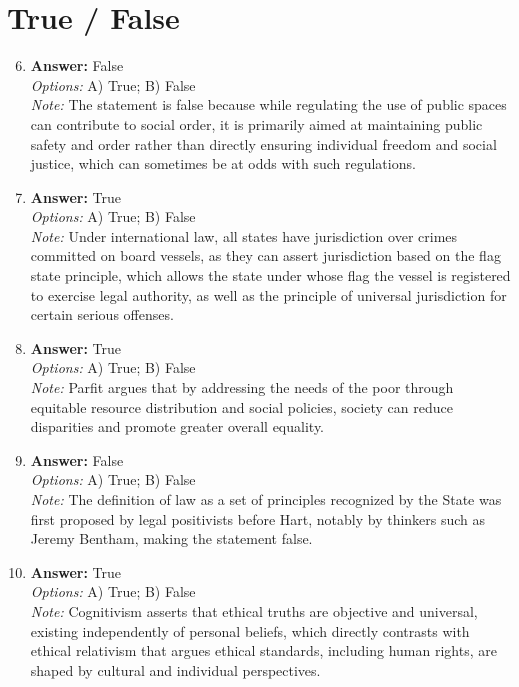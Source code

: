 \documentclass[12pt]{article}
\begin{document}
\section*{True / False}
\begin{enumerate}[label=\arabic*.]
\setcounter{enumi}{5}
\item \textbf{Answer:} False
\\ \textit{Options:} A) True; B) False
\\ \textit{Note:} The statement is false because while regulating the use of public spaces can contribute to social order, it is primarily aimed at maintaining public safety and order rather than directly ensuring individual freedom and social justice, which can sometimes be at odds with such regulations.
\item \textbf{Answer:} True
\\ \textit{Options:} A) True; B) False
\\ \textit{Note:} Under international law, all states have jurisdiction over crimes committed on board vessels, as they can assert jurisdiction based on the flag state principle, which allows the state under whose flag the vessel is registered to exercise legal authority, as well as the principle of universal jurisdiction for certain serious offenses.
\item \textbf{Answer:} True
\\ \textit{Options:} A) True; B) False
\\ \textit{Note:} Parfit argues that by addressing the needs of the poor through equitable resource distribution and social policies, society can reduce disparities and promote greater overall equality.
\item \textbf{Answer:} False
\\ \textit{Options:} A) True; B) False
\\ \textit{Note:} The definition of law as a set of principles recognized by the State was first proposed by legal positivists before Hart, notably by thinkers such as Jeremy Bentham, making the statement false.
\item \textbf{Answer:} True
\\ \textit{Options:} A) True; B) False
\\ \textit{Note:} Cognitivism asserts that ethical truths are objective and universal, existing independently of personal beliefs, which directly contrasts with ethical relativism that argues ethical standards, including human rights, are shaped by cultural and individual perspectives.
\end{enumerate}
\end{document}
